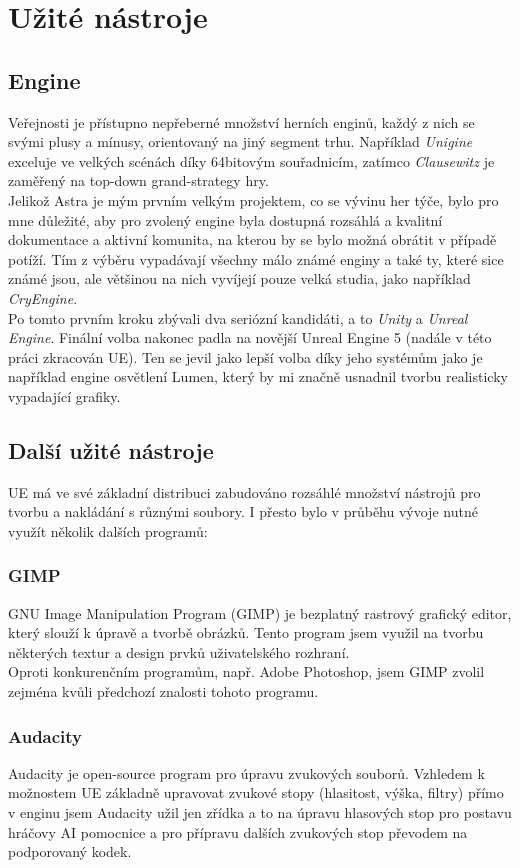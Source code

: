 \documentclass[12pt,a4paper,hidelinks]{article}
\begin{document}
\section{Užité nástroje}
\subsection{Engine}
Veřejnosti je přístupno nepřeberné množství herních enginů, každý z nich se svými plusy a mínusy, orientovaný na jiný segment trhu. Například \textit{Unigine} exceluje ve velkých scénách díky 64bitovým souřadnicím, zatímco \textit{Clausewitz} je zaměřený na top-down grand-strategy hry.\\
Jelikož Astra je mým prvním velkým projektem, co se vývinu her týče, bylo pro mne důležité, aby pro zvolený engine byla dostupná rozsáhlá a kvalitní dokumentace a aktivní komunita, na kterou by se bylo možná obrátit v případě potíží. Tím z výběru vypadávají všechny málo známé enginy a také ty, které sice známé jsou, ale většinou na nich vyvíjejí pouze velká studia, jako například \textit{CryEngine}.\\
Po tomto prvním kroku zbývali dva seriózní kandidáti, a to \textit{Unity} a \textit{Unreal Engine}. Finální volba nakonec padla na novější Unreal Engine 5 (nadále v této práci zkracován UE). Ten se jevil jako lepší volba díky jeho systémům jako je například engine osvětlení Lumen, který by mi značně usnadnil tvorbu realisticky vypadající grafiky.\\

\subsection{Další užité nástroje}
UE má ve své základní distribuci zabudováno rozsáhlé množství nástrojů pro tvorbu a nakládání s různými soubory. I přesto bylo v průběhu vývoje nutné využít několik dalších programů:\\
\subsubsection{GIMP}
GNU Image Manipulation Program (GIMP) je bezplatný rastrový grafický editor, který slouží k úpravě a tvorbě obrázků. Tento program jsem využil na tvorbu některých textur a design prvků uživatelského rozhraní.\\
Oproti konkurenčním programům, např. Adobe Photoshop, jsem GIMP zvolil zejména kvůli předchozí znalosti tohoto programu.\\
\subsubsection{Audacity}
Audacity je open-source program pro úpravu zvukových souborů. Vzhledem k možnostem UE základně upravovat zvukové stopy (hlasitost, výška, filtry) přímo v enginu jsem Audacity užil jen zřídka a to na úpravu hlasových stop pro postavu hráčovy AI pomocnice a pro přípravu dalších zvukových stop převodem na podporovaný kodek.\\
\end{document}
